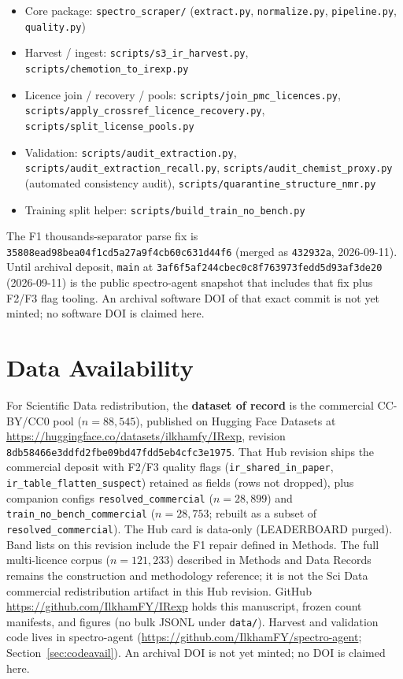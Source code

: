 \documentclass[pdflatex,sn-nature]{sn-jnl}
\begin{document}
\begin{itemize}
  \item Core package: \texttt{spectro\_scraper/}
        (\texttt{extract.py}, \texttt{normalize.py}, \texttt{pipeline.py},
        \texttt{quality.py})
  \item Harvest / ingest: \texttt{scripts/s3\_ir\_harvest.py},
        \texttt{scripts/chemotion\_to\_irexp.py}
  \item Licence join / recovery / pools:
        \texttt{scripts/join\_pmc\_licences.py},
        \texttt{scripts/apply\_crossref\_licence\_recovery.py},
        \texttt{scripts/split\_license\_pools.py}
  \item Validation: \texttt{scripts/audit\_extraction.py},
        \texttt{scripts/audit\_extraction\_recall.py},
        \texttt{scripts/audit\_chemist\_proxy.py}
        (automated consistency audit),
        \texttt{scripts/quarantine\_structure\_nmr.py}
  \item Training split helper: \texttt{scripts/build\_train\_no\_bench.py}
\end{itemize}
The F1 thousands-separator parse fix is
\texttt{35808ead98bea04f1cd5a27a9f4cb60c631d44f6} (merged as \texttt{432932a},
2026-09-11).
Until archival deposit, \texttt{main} at
\texttt{3af6f5af244cbec0c8f763973fedd5d93af3de20} (2026-09-11) is the public
spectro-agent snapshot that includes that fix plus F2/F3 flag tooling.
An archival software DOI of that exact commit is not yet minted; no software DOI
is claimed here.

\section{Data Availability}\label{sec:dataavail}

For Scientific Data redistribution, the \textbf{dataset of record} is the
commercial CC-BY/CC0 pool ($n=88{,}545$), published on Hugging Face Datasets at
\url{https://huggingface.co/datasets/ilkhamfy/IRexp}, revision
\texttt{8db58466e3ddfd2fbe09bd47fdd5eb4cfc3e1975}.
That Hub revision ships the commercial deposit with F2/F3 quality flags
(\texttt{ir\_shared\_in\_paper}, \texttt{ir\_table\_flatten\_suspect}) retained as
fields (rows not dropped), plus companion configs
\texttt{resolved\_commercial} ($n=28{,}899$) and
\texttt{train\_no\_bench\_commercial} ($n=28{,}753$; rebuilt as a subset of
\texttt{resolved\_commercial}).
The Hub card is data-only (LEADERBOARD purged).
Band lists on this revision include the F1 repair defined in Methods.
The full multi-licence corpus ($n=121{,}233$) described in Methods and Data
Records remains the construction and methodology reference; it is not the Sci Data
commercial redistribution artifact in this Hub revision.
GitHub \url{https://github.com/IlkhamFY/IRexp} holds this manuscript, frozen count
manifests, and figures (no bulk JSONL under \texttt{data/}).
Harvest and validation code lives in spectro-agent
(\url{https://github.com/IlkhamFY/spectro-agent}; Section~\ref{sec:codeavail}).
An archival DOI is not yet minted; no DOI is claimed here.
\end{document}
